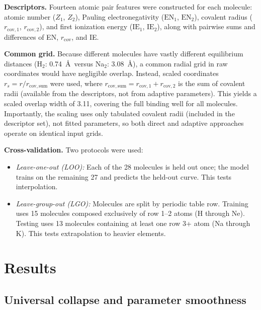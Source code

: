\documentclass[aps,prb,twocolumn,superscriptaddress,longbibliography,floatfix]{revtex4-2}
\begin{document}
\textbf{Descriptors.} Fourteen atomic pair features were constructed for each molecule: atomic number ($Z_1$, $Z_2$), Pauling electronegativity ($\mathrm{EN}_1$, $\mathrm{EN}_2$), covalent radius ($r_{\mathrm{cov},1}$, $r_{\mathrm{cov},2}$), and first ionization energy ($\mathrm{IE}_1$, $\mathrm{IE}_2$), along with pairwise sums and differences of EN, $r_\mathrm{cov}$, and IE.

\textbf{Common grid.} Because different molecules have vastly different equilibrium distances (H$_2$: 0.74~\AA\ versus Na$_2$: 3.08~\AA), a common radial grid in raw coordinates would have negligible overlap. Instead, scaled coordinates $r_s = r / r_{\mathrm{cov,sum}}$ were used, where $r_{\mathrm{cov,sum}} = r_{\mathrm{cov},1} + r_{\mathrm{cov},2}$ is the sum of covalent radii (available from the descriptors, not from adaptive parameters). This yields a scaled overlap width of 3.11, covering the full binding well for all molecules. Importantly, the scaling uses only tabulated covalent radii (included in the descriptor set), not fitted parameters, so both direct and adaptive approaches operate on identical input grids.

\textbf{Cross-validation.} Two protocols were used:
\begin{itemize}
  \item \emph{Leave-one-out (LOO):} Each of the 28 molecules is held out once; the model trains on the remaining 27 and predicts the held-out curve. This tests interpolation.
  \item \emph{Leave-group-out (LGO):} Molecules are split by periodic table row. Training uses 15 molecules composed exclusively of row 1--2 atoms (H through Ne). Testing uses 13 molecules containing at least one row 3+ atom (Na through K). This tests extrapolation to heavier elements.
\end{itemize}


\section{Results}
\label{sec:results}

\subsection{Universal collapse and parameter smoothness}
\label{sec:collapse}
\end{document}
